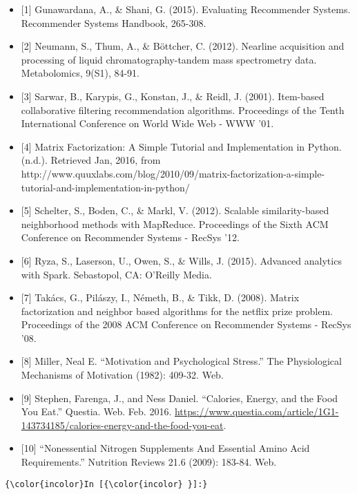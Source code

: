 \documentclass[11pt]{article}
\providecommand{\tightlist}{%
      \setlength{\itemsep}{0pt}\setlength{\parskip}{0pt}}
\begin{document}
\begin{itemize}
\tightlist
\item
  {[}1{]} Gunawardana, A., \& Shani, G. (2015). Evaluating Recommender
  Systems. Recommender Systems Handbook, 265-308.
\item
  {[}2{]} Neumann, S., Thum, A., \& Böttcher, C. (2012). Nearline
  acquisition and processing of liquid chromatography-tandem mass
  spectrometry data. Metabolomics, 9(S1), 84-91.
\item
  {[}3{]} Sarwar, B., Karypis, G., Konstan, J., \& Reidl, J. (2001).
  Item-based collaborative filtering recommendation algorithms.
  Proceedings of the Tenth International Conference on World Wide Web -
  WWW '01.
\item
  {[}4{]} Matrix Factorization: A Simple Tutorial and Implementation in
  Python. (n.d.). Retrieved Jan, 2016, from
  http://www.quuxlabs.com/blog/2010/09/matrix-factorization-a-simple-tutorial-and-implementation-in-python/
\item
  {[}5{]} Schelter, S., Boden, C., \& Markl, V. (2012). Scalable
  similarity-based neighborhood methods with MapReduce. Proceedings of
  the Sixth ACM Conference on Recommender Systems - RecSys '12.
\item
  {[}6{]} Ryza, S., Laserson, U., Owen, S., \& Wills, J. (2015).
  Advanced analytics with Spark. Sebastopol, CA: O'Reilly Media.
\item
  {[}7{]} Takács, G., Pilászy, I., Németh, B., \& Tikk, D. (2008).
  Matrix factorization and neighbor based algorithms for the netflix
  prize problem. Proceedings of the 2008 ACM Conference on Recommender
  Systems - RecSys '08.
\item
  {[}8{]} Miller, Neal E. ``Motivation and Psychological Stress.'' The
  Physiological Mechanisms of Motivation (1982): 409-32. Web.
\item
  {[}9{]} Stephen, Farenga, J., and Ness Daniel. ``Calories, Energy, and
  the Food You Eat.'' Questia. Web. Feb. 2016.
  \url{https://www.questia.com/article/1G1-143734185/calories-energy-and-the-food-you-eat}.
\item
  {[}10{]} ``Nonessential Nitrogen Supplements And Essential Amino Acid
  Requirements.'' Nutrition Reviews 21.6 (2009): 183-84. Web.
\end{itemize}

    \begin{Verbatim}[commandchars=\\\{\}]
{\color{incolor}In [{\color{incolor} }]:} 
\end{Verbatim}


    
    
    
    
\end{document}
